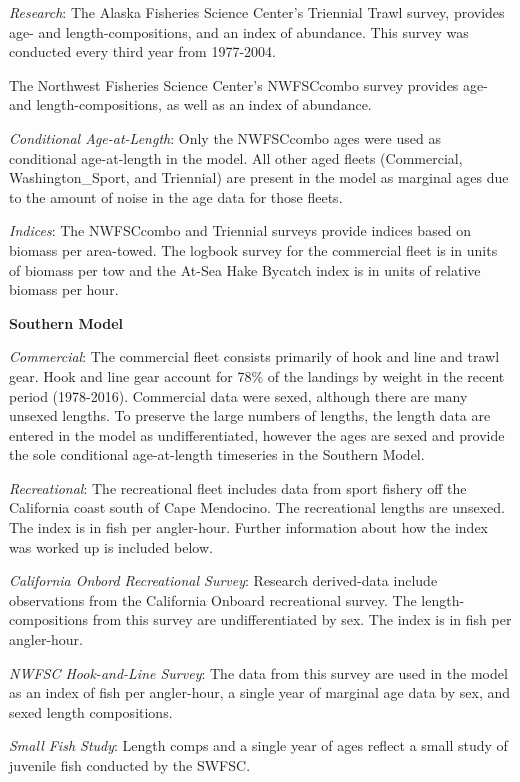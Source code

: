 \documentclass[12pt,]{article}
\begin{document}
\emph{Research}: The Alaska Fisheries Science Center's Triennial Trawl
survey, provides age- and length-compositions, and an index of
abundance. This survey was conducted every third year from 1977-2004.

The Northwest Fisheries Science Center's NWFSCcombo survey provides age-
and length-compositions, as well as an index of abundance.

\emph{Conditional Age-at-Length}: Only the NWFSCcombo ages were used as
conditional age-at-length in the model. All other aged fleets
(Commercial, Washington\_Sport, and Triennial) are present in the model
as marginal ages due to the amount of noise in the age data for those
fleets.

\emph{Indices}: The NWFSCcombo and Triennial surveys provide indices
based on biomass per area-towed. The logbook survey for the commercial
fleet is in units of biomass per tow and the At-Sea Hake Bycatch index
is in units of relative biomass per hour.

\textbf{Southern Model}

\emph{Commercial}: The commercial fleet consists primarily of hook and
line and trawl gear. Hook and line gear account for 78\% of the landings
by weight in the recent period (1978-2016). Commercial data were sexed,
although there are many unsexed lengths. To preserve the large numbers
of lengths, the length data are entered in the model as
undifferentiated, however the ages are sexed and provide the sole
conditional age-at-length timeseries in the Southern Model.

\emph{Recreational}: The recreational fleet includes data from sport
fishery off the California coast south of Cape Mendocino. The
recreational lengths are unsexed. The index is in fish per angler-hour.
Further information about how the index was worked up is included below.

\emph{California Onbord Recreational Survey}: Research derived-data
include observations from the California Onboard recreational survey.
The length-compositions from this survey are undifferentiated by sex.
The index is in fish per angler-hour.

\emph{NWFSC Hook-and-Line Survey}: The data from this survey are used in
the model as an index of fish per angler-hour, a single year of marginal
age data by sex, and sexed length compositions.

\emph{Small Fish Study}: Length comps and a single year of ages reflect
a small study of juvenile fish conducted by the SWFSC.
\end{document}
